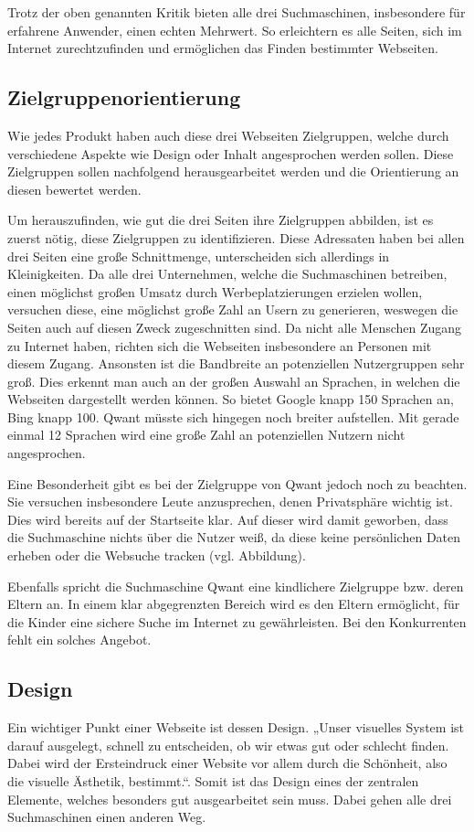Trotz der oben genannten Kritik bieten alle drei Suchmaschinen, insbesondere für erfahrene Anwender, einen echten Mehrwert.
So erleichtern es alle Seiten, sich im Internet zurechtzufinden und ermöglichen das Finden bestimmter Webseiten.

\subsection{Zielgruppenorientierung}
Wie jedes Produkt haben auch diese drei Webseiten Zielgruppen, welche durch verschiedene Aspekte wie Design oder Inhalt
angesprochen werden sollen. Diese Zielgruppen sollen nachfolgend herausgearbeitet werden und die Orientierung an diesen
bewertet werden.

Um herauszufinden, wie gut die drei Seiten ihre Zielgruppen abbilden, ist es zuerst nötig, diese Zielgruppen zu
identifizieren. Diese Adressaten haben bei allen drei Seiten eine große Schnittmenge, unterscheiden sich allerdings in
Kleinigkeiten. Da alle drei Unternehmen, welche die Suchmaschinen betreiben, einen möglichst großen Umsatz durch Werbeplatzierungen
erzielen wollen, versuchen diese, eine möglichst große Zahl an Usern zu generieren, weswegen die Seiten auch auf diesen Zweck
zugeschnitten sind.  Da nicht alle Menschen Zugang zu Internet haben, richten sich die Webseiten insbesondere an Personen
mit diesem Zugang. Ansonsten ist die Bandbreite an potenziellen Nutzergruppen sehr groß. Dies erkennt man auch an der großen
Auswahl an Sprachen, in welchen die Webseiten dargestellt werden können. So bietet Google knapp 150 Sprachen an, Bing
knapp 100. Qwant müsste sich hingegen noch breiter aufstellen. Mit gerade einmal 12 Sprachen wird eine große Zahl an
potenziellen Nutzern nicht angesprochen.

Eine Besonderheit gibt es bei der Zielgruppe von Qwant jedoch noch zu beachten. Sie versuchen insbesondere Leute anzusprechen,
denen Privatsphäre wichtig ist. Dies wird bereits auf der Startseite klar. Auf dieser wird damit geworben, dass die Suchmaschine
nichts über die Nutzer weiß, da diese keine persönlichen Daten erheben oder die Websuche tracken (vgl. Abbildung).

Ebenfalls spricht die Suchmaschine Qwant eine kindlichere Zielgruppe bzw. deren Eltern an. In einem klar abgegrenzten
Bereich wird es den Eltern ermöglicht, für die Kinder eine sichere Suche im Internet zu gewährleisten. Bei den Konkurrenten
fehlt ein solches Angebot.

\subsection{Design}
Ein wichtiger Punkt einer Webseite ist dessen Design. „Unser visuelles System ist darauf ausgelegt, schnell zu entscheiden,
ob wir etwas gut oder schlecht finden. Dabei wird der Ersteindruck einer Website vor allem durch die Schönheit, also die
visuelle Ästhetik, bestimmt.“\cite[Seite 43]{Thielsch.}.
Somit ist das Design eines
der zentralen Elemente, welches besonders gut ausgearbeitet sein muss. Dabei gehen alle drei Suchmaschinen einen anderen Weg.

